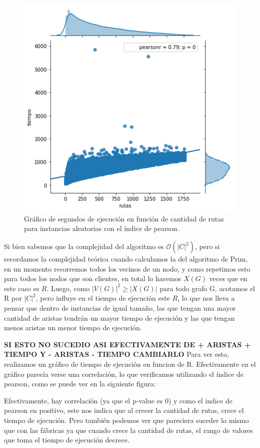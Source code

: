 \documentclass[A4paper,oneside,fleqn,11pt]{article}
\theoremstyle{definition}
\begin{document}
 \begin{figure}
\centering
\includegraphics[scale=0.4]{pearson.png}
\caption{ Gráfico de segundos de ejecución en función de cantidad de rutas para instancias aleatorias con el índice de pearson.}
\end{figure}

 Si bien sabemos que la complejidad del algoritmo es $\mathcal{O} (|C|^2)$, pero si recordamos la complejidad teórica cuando calculamos la del algoritmo de Prim, en un momento recorremos todos los vecinos de un nodo, y como repetimos esto para todos los nodos que son clientes, en total lo hacemos $X(G)$ veces que en este caso es $R$. Luego, como $|V(G)|^2 \geq |X(G)|$ para todo grafo G, acotamos el R por $|C|^2$, pero influye en el tiempo de ejecución este $R$, lo que nos lleva a pensar que dentro de instancias de igual tamaño, las que tengan una mayor cantidad de aristas tendrán un mayor tiempo de ejecución y las que tengan menos aristas un menor tiempo de ejecución.



\textbf{SI ESTO NO SUCEDIO ASI EFECTIVAMENTE DE + ARISTAS + TIEMPO Y - ARISTAS - TIEMPO CAMBIARLO} Para ver esto, realizamos un gráfico de tiempo de ejecución en funcion de R. 
Efectivamente en el gráfico parecía verse una correlación, lo que verificamos utilizando el índice de pearson, como se puede ver en la siguiente figura:

 

Efectivamente, hay correlación (ya que el p-value es 0) y como el indice de pearson en positivo, este nos indica que al crecer la cantidad de rutas, crece el tiempo de ejecución. Pero también podemos ver que pareciera suceder lo mismo que con las fábricas ya que cuando crece la cantidad de rutas, el rango de valores que toma el tiempo de ejecución decrece.
\end{document}
